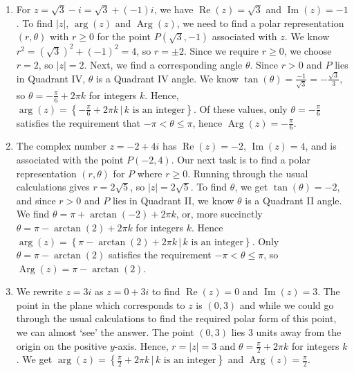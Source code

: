 {
\begin{enumerate}

\item For $z = \sqrt{3} -i = \sqrt{3} + (-1)i$, we have $\operatorname{Re}(z) = \sqrt{3}$ and $\operatorname{Im}(z) = -1$.   To find $|z|$, $\operatorname{arg}(z)$ and $\operatorname{Arg}(z)$, we need to find a polar representation $(r,\theta)$ with $r \geq 0$ for the point $P(\sqrt{3},-1)$ associated with $z$.   We know $r^2 = (\sqrt{3})^2 + (-1)^2 = 4$, so $r = \pm 2$.  Since we require $r \geq 0$, we choose $r =2$, so $|z| = 2$.  Next, we find a corresponding angle $\theta$.  Since $r>0$ and $P$ lies in Quadrant IV, $\theta$ is a Quadrant IV angle.  We know $\tan(\theta) = \frac{-1}{\sqrt{3}} = -\frac{\sqrt{3}}{3}$, so $\theta = -\frac{\pi}{6} + 2\pi k$ for integers $k$.  Hence, $\operatorname{arg}(z) = \left\{-\frac{\pi}{6} + 2\pi k \, | \, \text{$k$ is an integer} \right\}$. Of these values, only  $\theta = -\frac{\pi}{6}$  satisfies the requirement that $-\pi < \theta \leq \pi$, hence $\operatorname{Arg}(z) = -\frac{\pi}{6}$.  

\item The complex number $z = -2+4i$ has  $\operatorname{Re}(z) = -2$,   $\operatorname{Im}(z) = 4$, and is associated with the point $P(-2,4)$.  Our next task is to find a polar representation $(r,\theta)$ for $P$ where $r \geq 0$. Running through the usual calculations gives $r = 2\sqrt{5}$, so $|z| = 2\sqrt{5}$.  To find $\theta$, we get $\tan(\theta) = -2$, and since $r > 0$ and $P$ lies in Quadrant II, we know $\theta$  is a Quadrant II angle.  We find $\theta = \pi + \arctan(-2) + 2\pi k$, or, more succinctly  $\theta = \pi - \arctan(2) + 2\pi k$ for integers $k$.  Hence $\operatorname{arg}(z) = \left\{\pi - \arctan(2) + 2\pi k \, | \, \text{$k$ is an integer}\right\}$.  Only  $\theta = \pi - \arctan(2)$ satisfies the requirement $-\pi < \theta \leq \pi$,  so $\operatorname{Arg}(z) = \pi - \arctan(2)$. 

\item    We rewrite $z = 3i$ as $z = 0+3i$ to find $\operatorname{Re}(z) = 0$ and $\operatorname{Im}(z) = 3$.  The point in the plane which corresponds to $z$ is $(0,3)$ and while we could go through the usual calculations to find the required polar form of this point, we can almost `see' the answer.  The point  $(0,3)$ lies $3$ units away from the origin on the positive $y$-axis.  Hence, $r=|z|=3$ and $\theta = \frac{\pi}{2} + 2\pi k$ for integers $k$. We get $\operatorname{arg}(z) = \left\{ \frac{\pi}{2} + 2\pi k \, | \, \text{$k$ is an integer} \right\}$ and $\operatorname{Arg}(z) = \frac{\pi}{2}$. 


\end{enumerate}}

